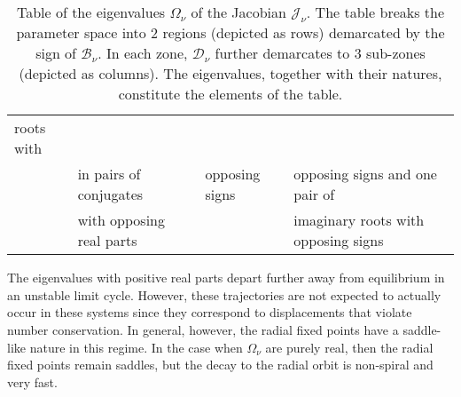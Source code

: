 \documentclass[a4paper,10pt]{article}
\begin{document}
\begin{table}
\begin{center}
\begin{tabular}{|l|l|l|l|}
													      roots with \\			& in pairs of conjugates			& opposing signs			    &opposing signs
													     and one pair of\\
		& with opposing real parts			&		      	                    &imaginary roots   
													     with opposing 												     		     signs\\
\hline \end{tabular}
\end{center}
\caption{Table of the eigenvalues $\Omega_\nu$ of the Jacobian $\mathcal{J}_\nu$. The table breaks the parameter space into $2$ regions (depicted as rows) demarcated by the sign of $\mathcal{B}_\nu$. In each zone, $\mathcal{D}_\nu$ further demarcates to $3$ sub-zones (depicted as columns). The eigenvalues, together with their natures, constitute the elements of the table.}
\label{tab:roots}
\end{table}
The eigenvalues with positive real parts depart further away from equilibrium in an unstable limit cycle. However, these trajectories are not expected to actually occur in these systems since they correspond to displacements that violate number conservation. In general, however, the radial fixed points have a saddle-like nature in this regime. In the case when $\Omega_\nu$ are purely real, then the radial fixed points remain saddles, but the decay to the radial orbit is non-spiral and very fast.
\end{document}
